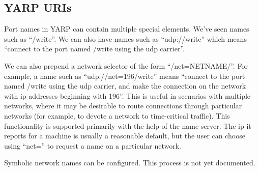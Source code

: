 \documentclass[a4]{article}
\begin{document}









\subsection{YARP URIs}

Port names in YARP can contain multiple special elements.
We've seen names such as ``/write''.  We can also have
names such as ``udp://write'' which means ``connect
to the port named /write using the udp carrier''.

We can also prepend a network selector of the form
``/net=NETNAME/''.  For example, a name such as
``udp://net=196/write'' means ``connect to the 
port named /write using the udp carrier, and make the
connection on the network with ip addresses beginning with
196''.
%
This is useful in scenarios with multiple networks, where it may be
desirable to route connections through particular networks (for
example, to devote a network to time-critical traffic).  This
functionality is supported primarily with the help of the name server.
The ip it reports for a machine is usually a reasonable default, but
the user can choose using ``net='' to request a name on a particular
network.

Symbolic network names can be configured.  This process 
is not yet documented.

\end{document}
